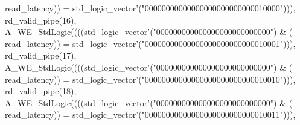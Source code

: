 \begin{DoxyCode}
{      read_latency}\textcolor{vhdlchar}{)}\textcolor{vhdlchar}{)} \textcolor{vhdlchar}{=} \textcolor{comment}{std\_logic\_vector}\textcolor{vhdlchar}{'}\textcolor{vhdlchar}{(}\textcolor{vhdllogic}{"00000000000000000000000000010000"}\textcolor{vhdlchar}{)}\textcolor{vhdlchar}{)}\textcolor{vhdlchar}{)}\textcolor{vhdlchar}{,} \textcolor{vhdlchar}{
      rd_valid_pipe}\textcolor{vhdlchar}{(}\textcolor{vhdllogic}{}\textcolor{vhdllogic}{16}\textcolor{vhdlchar}{)}\textcolor{vhdlchar}{,} \textcolor{vhdlchar}{A\_WE\_StdLogic}\textcolor{vhdlchar}{(}\textcolor{vhdlchar}{(}\textcolor{vhdlchar}{(}\textcolor{vhdlchar}{(}\textcolor{comment}{std\_logic\_vector}\textcolor{vhdlchar}{'}\textcolor{vhdlchar}{(}\textcolor{vhdllogic}{"000000000000000000000000000"}\textcolor{vhdlchar}{)} \textcolor{vhdlchar}{&} \textcolor{vhdlchar}{(}\textcolor{vhdlchar}{
      read_latency}\textcolor{vhdlchar}{)}\textcolor{vhdlchar}{)} \textcolor{vhdlchar}{=} \textcolor{comment}{std\_logic\_vector}\textcolor{vhdlchar}{'}\textcolor{vhdlchar}{(}\textcolor{vhdllogic}{"00000000000000000000000000010001"}\textcolor{vhdlchar}{)}\textcolor{vhdlchar}{)}\textcolor{vhdlchar}{)}\textcolor{vhdlchar}{,} \textcolor{vhdlchar}{
      rd_valid_pipe}\textcolor{vhdlchar}{(}\textcolor{vhdllogic}{}\textcolor{vhdllogic}{17}\textcolor{vhdlchar}{)}\textcolor{vhdlchar}{,} \textcolor{vhdlchar}{A\_WE\_StdLogic}\textcolor{vhdlchar}{(}\textcolor{vhdlchar}{(}\textcolor{vhdlchar}{(}\textcolor{vhdlchar}{(}\textcolor{comment}{std\_logic\_vector}\textcolor{vhdlchar}{'}\textcolor{vhdlchar}{(}\textcolor{vhdllogic}{"000000000000000000000000000"}\textcolor{vhdlchar}{)} \textcolor{vhdlchar}{&} \textcolor{vhdlchar}{(}\textcolor{vhdlchar}{
      read_latency}\textcolor{vhdlchar}{)}\textcolor{vhdlchar}{)} \textcolor{vhdlchar}{=} \textcolor{comment}{std\_logic\_vector}\textcolor{vhdlchar}{'}\textcolor{vhdlchar}{(}\textcolor{vhdllogic}{"00000000000000000000000000010010"}\textcolor{vhdlchar}{)}\textcolor{vhdlchar}{)}\textcolor{vhdlchar}{)}\textcolor{vhdlchar}{,} \textcolor{vhdlchar}{
      rd_valid_pipe}\textcolor{vhdlchar}{(}\textcolor{vhdllogic}{}\textcolor{vhdllogic}{18}\textcolor{vhdlchar}{)}\textcolor{vhdlchar}{,} \textcolor{vhdlchar}{A\_WE\_StdLogic}\textcolor{vhdlchar}{(}\textcolor{vhdlchar}{(}\textcolor{vhdlchar}{(}\textcolor{vhdlchar}{(}\textcolor{comment}{std\_logic\_vector}\textcolor{vhdlchar}{'}\textcolor{vhdlchar}{(}\textcolor{vhdllogic}{"000000000000000000000000000"}\textcolor{vhdlchar}{)} \textcolor{vhdlchar}{&} \textcolor{vhdlchar}{(}\textcolor{vhdlchar}{
      read_latency}\textcolor{vhdlchar}{)}\textcolor{vhdlchar}{)} \textcolor{vhdlchar}{=} \textcolor{comment}{std\_logic\_vector}\textcolor{vhdlchar}{'}\textcolor{vhdlchar}{(}\textcolor{vhdllogic}{"00000000000000000000000000010011"}\textcolor{vhdlchar}{)}\textcolor{vhdlchar}{)}\textcolor{vhdlchar}{)}\textcolor{vhdlchar}{,} \textcolor{vhdlchar}{
}
\end{DoxyCode}
